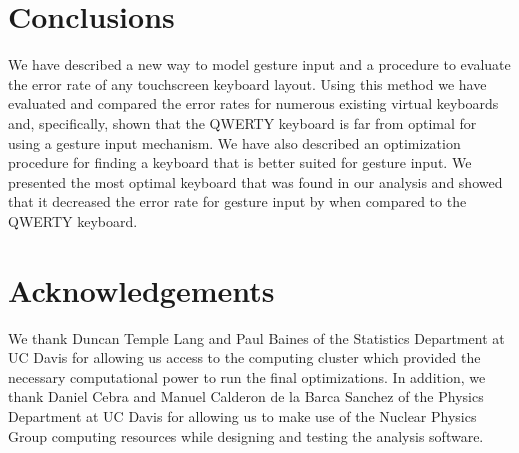 \documentclass[final,1p,times,authoryear]{elsarticle}
\begin{document}
\section{\textbf{Conclusions}}\label{sec:Conclusions}

We have described a new way to model gesture input and
a procedure to evaluate the error rate of any touchscreen
keyboard layout. Using this method we have evaluated and compared the error rates for numerous
existing virtual keyboards and, specifically, shown that the QWERTY keyboard
is far from optimal for using a gesture input mechanism. We have also
described an optimization procedure for finding a keyboard that is better suited for gesture input.
We presented the most optimal keyboard that was found in our analysis
 and showed that it decreased the error rate for gesture input
by  when compared to the QWERTY keyboard.


\section*{Acknowledgements}
We thank Duncan Temple Lang and Paul Baines of the Statistics
Department at UC Davis for allowing us access to the computing cluster
which provided the necessary computational power to run the final
optimizations. In addition, we thank Daniel Cebra and Manuel
Calderon de la Barca Sanchez of the Physics Department at UC Davis
for allowing us to make use of the Nuclear Physics Group computing 
resources while designing and testing the analysis software.
\end{document}
